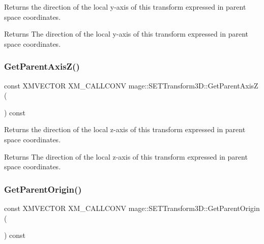 Returns the direction of the local y-\/axis of this transform expressed in parent space coordinates.

\begin{DoxyReturn}{Returns}
The direction of the local y-\/axis of this transform expressed in parent space coordinates. 
\end{DoxyReturn}
\mbox{\label{classmage_1_1_s_e_t_transform3_d_a5db157206e7244a3fe50f82b80cf0554}} 
\subsubsection{\texorpdfstring{Get\+Parent\+Axis\+Z()}{GetParentAxisZ()}}
{\footnotesize\ttfamily const X\+M\+V\+E\+C\+T\+OR X\+M\+\_\+\+C\+A\+L\+L\+C\+O\+NV mage\+::\+S\+E\+T\+Transform3\+D\+::\+Get\+Parent\+AxisZ (\begin{DoxyParamCaption}{ }\end{DoxyParamCaption}) const\hspace{0.3cm}{\ttfamily [noexcept]}}

Returns the direction of the local z-\/axis of this transform expressed in parent space coordinates.

\begin{DoxyReturn}{Returns}
The direction of the local z-\/axis of this transform expressed in parent space coordinates. 
\end{DoxyReturn}
\mbox{\label{classmage_1_1_s_e_t_transform3_d_acfa75ab3397daa920e8fa41429b58cbe}} 
\subsubsection{\texorpdfstring{Get\+Parent\+Origin()}{GetParentOrigin()}}
{\footnotesize\ttfamily const X\+M\+V\+E\+C\+T\+OR X\+M\+\_\+\+C\+A\+L\+L\+C\+O\+NV mage\+::\+S\+E\+T\+Transform3\+D\+::\+Get\+Parent\+Origin (\begin{DoxyParamCaption}{ }\end{DoxyParamCaption}) const\hspace{0.3cm}{\ttfamily [noexcept]}}

